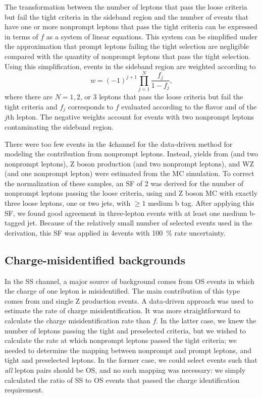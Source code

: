 The transformation between the number of leptons that pass the loose criteria
but fail the tight criteria in the sideband region and the number of events that
have one or more nonprompt leptons that pass the tight criteria can be expressed
in terms of $f$ as a system of linear equations. This system can be simplified
under the approximation that prompt leptons failing the tight selection are
negligible compared with the quantity of nonprompt leptons that pass the tight
selection. Using this simplification, events in the sideband region are weighted
according to
\begin{equation}
  w = (-1)^{j+1} \prod_{j=1}^N \frac{f_j}{1-f_j},
  \label{eq:fr-weight}
\end{equation}
where there are $N=1, 2$, or $3$ leptons that pass the loose criteria but fail
the tight criteria and $f_j$ corresponds to $f$ evaluated according to the
flavor and \pT of the $j$th lepton. The negative weights account for events with
two nonprompt leptons contaminating the sideband region.

There were too few events in the 4\lep channel for the data-driven method for
modeling the contribution from nonprompt leptons. Instead, yields from \ttbar
(and two nonprompt leptons), Z boson production (and two nonprompt leptons), and
WZ (and one nonprompt lepton) were estimated from the MC simulation. To correct
the normalization of these samples, an SF of 2 was derived for the number of
nonprompt leptons passing the loose criteria, using \ttbar and Z boson MC with
exactly three loose leptons, one or two jets, with $\ge1$ medium b tag. After
applying this SF, we found good agreement in three-lepton events with at least one
medium b-tagged jet. Because of the relatively small number of selected events
used in the derivation, this SF was applied in 4\lep events with
\SI{100}{\percent} rate uncertainty.
\begin{table}
  
\end{table}

\subsection{Charge-misidentified backgrounds}
In the SS \ttW channel, a major source of background comes from OS events in
which the charge of one lepton is misidentified. The main contribution of this
type comes from \ttbar and single Z production events. A data-driven approach
was
used to estimate the rate of charge misidentification. It was more
straightforward to calculate the charge misidentification rate than $f$. In the
latter case, we knew the number of leptons passing the tight and preselected
criteria, but we wished to calculate the rate at which nonprompt leptons passed the
tight criteria; we needed to determine the mapping between nonprompt and prompt
leptons,
and tight and preselected leptons. In the former case, we could select events such
that \emph{all} lepton pairs should be OS, and no such mapping was necessary: we
simply calculated the ratio of SS to OS events that passed the charge
identification requirement.

